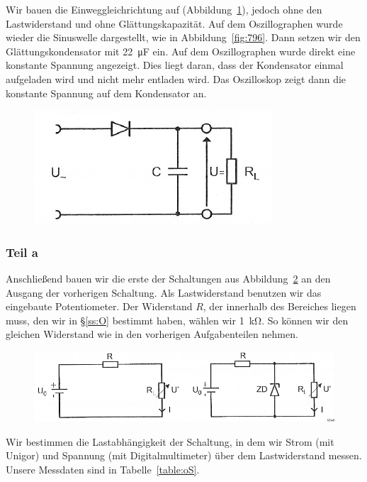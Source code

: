 Wir bauen die Einweggleichrichtung auf (Abbildung~\ref{fig:2-8}), jedoch ohne
den Lastwiderstand und ohne Glättungskapazität. Auf dem Oszillographen wurde
wieder die Sinuswelle dargestellt, wie in Abbildung~\ref{fig:796}. Dann setzen
wir den Glättungskondensator mit \SI{22}{\micro\farad} ein. Auf dem
Oszillographen wurde direkt eine konstante Spannung angezeigt. Dies liegt
daran, dass der Kondensator einmal aufgeladen wird und nicht mehr entladen
wird. Das Oszilloskop zeigt dann die konstante Spannung auf dem Kondensator an.

\begin{figure}[htbp]
	\centering
	\caption{%
		\cite[Abbildung~2.8]{physik313-Anleitung}
	}
	\label{fig:2-8}
	\includegraphics[width=.45\linewidth]{Bilder_aus_Anleitung/2-8.png}
\end{figure}

\subsubsection{Teil a}

Anschließend bauen wir die erste der Schaltungen aus Abbildung~\ref{fig:2-11}
an den Ausgang der vorherigen Schaltung. Als Lastwiderstand benutzen wir das
eingebaute Potentiometer. Der Widerstand $R$, der innerhalb des Bereiches
liegen muss, den wir in §\ref{ss:O} bestimmt haben, wählen wir
\SI{1}{\kilo\ohm}. So können wir den gleichen Widerstand wie in den vorherigen
Aufgabenteilen nehmen.

\begin{figure}[htbp]
	\centering
	\caption{%
		\cite[Abbildung~2.11]{physik313-Anleitung}
	}
	\label{fig:2-11}
	\includegraphics[width=\linewidth]{Bilder_aus_Anleitung/2-11.png}
\end{figure}

Wir bestimmen die Lastabhängigkeit der Schaltung, in dem wir Strom (mit
Unigor) und Spannung (mit Digitalmultimeter) über dem Lastwiderstand messen.
Unsere Messdaten sind in Tabelle~\ref{table:oS}.

